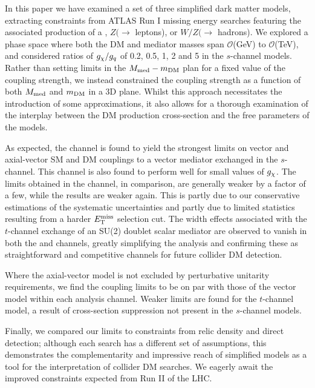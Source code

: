 
In this paper we have examined a set of three simplified dark matter models, extracting constraints from ATLAS Run I missing energy searches featuring the associated production of a \monojet, $Z(\rightarrow$ leptons), or $W/Z (\rightarrow$ hadrons). We explored a phase space where both the DM and mediator masses span $\mathcal{O}$(GeV) to $\mathcal{O}$(TeV), and considered ratios of $g_{\chi} / g_q$ of 0.2, 0.5, 1, 2 and 5 in the $s$-channel models. 
Rather than setting limits in the $M_{\mathrm{med}} - m_{\mathrm{DM}}$ plan for a fixed value of the coupling strength, we instead constrained the coupling strength as a function of both $M_{\mathrm{med}}$ and $m_{\mathrm{DM}}$ in a 3D plane. Whilst this approach necessitates the introduction of some approximations, it also allows for a thorough examination of the interplay between the DM production cross-section and the free parameters of the models.

As expected, the \monojet channel is found to yield the strongest limits on vector and axial-vector SM and DM couplings to a vector mediator exchanged in the $s$-channel. This channel is also found to perform well for small values of $g_{\chi}$. The limits obtained in the \monoZ channel, in comparison, are generally weaker by a factor of a few, while the \monoWZ results are weaker again. This is partly due to our conservative estimations of the systematic uncertainties and partly due to limited statistics resulting from a harder $E_{\mathrm{T}}^{\mathrm{miss}}$ selection cut. The width effects associated with the $t$-channel exchange of an SU(2) doublet scalar mediator are observed to vanish in both the \monoZ and \monoWZ channels, greatly simplifying the analysis and confirming these as straightforward and competitive channels for future collider DM detection.

Where the axial-vector model is not excluded by perturbative unitarity requirements, we find the coupling limits to be on par with those of the vector model within each analysis channel. Weaker limits are found for the $t$-channel model, a result of cross-section suppression not present in the $s$-channel models.

Finally, we compared our limits to constraints from relic density and direct detection; although each search has a different set of assumptions, this demonstrates the complementarity and impressive reach of simplified models as a tool for the interpretation of collider DM searches. We eagerly await the improved constraints expected from Run II of the LHC.

